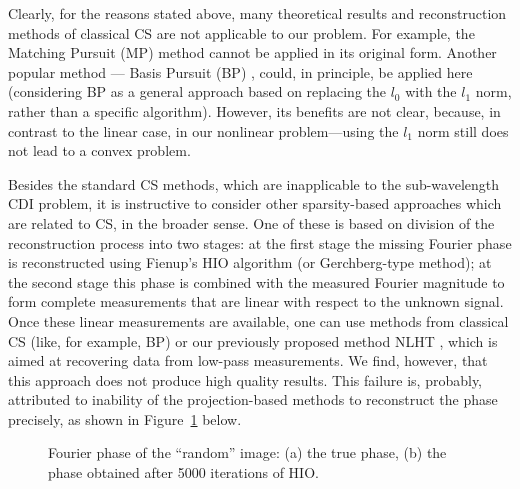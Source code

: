 Clearly, for the reasons stated above, many theoretical results and
reconstruction methods of classical CS are not applicable to our
problem. For example, the Matching Pursuit (MP) method
 cannot be applied in its original
form. Another popular method — Basis Pursuit (BP) ,
could, in principle, be applied here (considering BP as a general
approach based on replacing the $l_{0}$ with the $l_{1}$ norm, rather
than a specific algorithm). However, its benefits are not clear,
because, in contrast to the linear case, in our nonlinear
problem---using the $l_{1}$ norm still does not lead to a convex problem.


Besides the standard CS methods, which are inapplicable to the
sub-wavelength CDI problem, it is instructive to consider other
sparsity-based approaches which are related to CS, in the broader
sense.  One of these is based on division of the reconstruction
process into two stages: at the first stage the missing Fourier phase
is reconstructed using Fienup’s HIO algorithm (or Gerchberg-type
method); at the second stage this phase is combined with the measured
Fourier magnitude to form complete measurements that are linear with
respect to the unknown signal. Once these linear measurements are
available, one can use methods from classical CS (like, for example,
BP) or our previously proposed method NLHT 
, which is aimed at recovering data from
low-pass measurements. We find, however, that this approach
does not produce high quality results. This failure is, probably,
attributed to inability of the projection-based methods to reconstruct
the phase precisely, as shown in Figure~\ref{fig:fourier-phase-hio}
below.

\begin{figure}[H]
  \centering
  \qquad{}
  \caption[Fourier phase of the ``random'' image]{Fourier phase of the ``random'' image: (a) the true
    phase, (b) the phase obtained after 5000 iterations of
    HIO.}
  \label{fig:fourier-phase-hio}
\end{figure}


